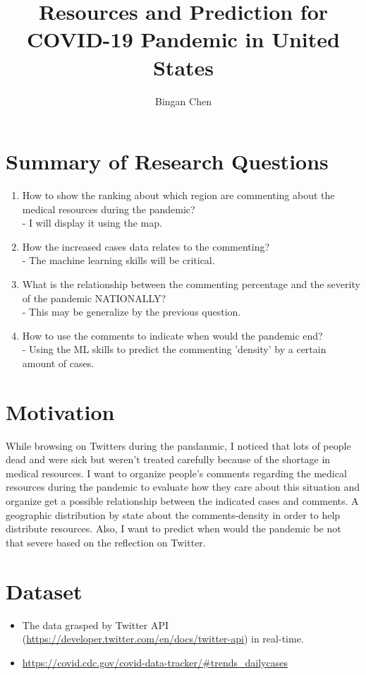 \documentclass[12pt,a4paper]{article}
\title{Resources and Prediction for COVID-19 Pandemic in United States}
\author{Bingan Chen}
\begin{document}
	\maketitle
	\section*{Summary of Research Questions}
	\begin{enumerate}
		\item How to show the ranking about which region are commenting about the medical resources during the pandemic?\\
		- I will display it using the map.
		\item How the increased cases data relates to the commenting?\\
		- The machine learning skills will be critical.
		\item What is the relationship between the commenting percentage and the severity of the pandemic NATIONALLY?\\
		- This may be generalize by the previous question.
		\item How to use the comments to indicate when would the pandemic end?\\
		- Using the ML skills to predict the commenting 'density' by a certain amount of cases.
	\end{enumerate}
	\section*{Motivation}
	While browsing on Twitters during the pandanmic, I noticed that lots of people dead and were sick but weren't treated carefully because of the shortage in medical resources. I want to organize people's comments regarding the medical resources during the pandemic to evaluate how they care about this situation and organize get a possible relationship between the indicated cases and comments. A geographic distribution by state about the comments-density in order to help distribute resources. Also, I want to predict when would the pandemic be not that severe based on the reflection on Twitter.
	\section*{Dataset}
	\begin{itemize}
		\item The data grasped by Twitter API (\url{https://developer.twitter.com/en/docs/twitter-api}) in real-time.
		\item \url{https://covid.cdc.gov/covid-data-tracker/#trends_dailycases}
	\end{itemize}
\end{document}
